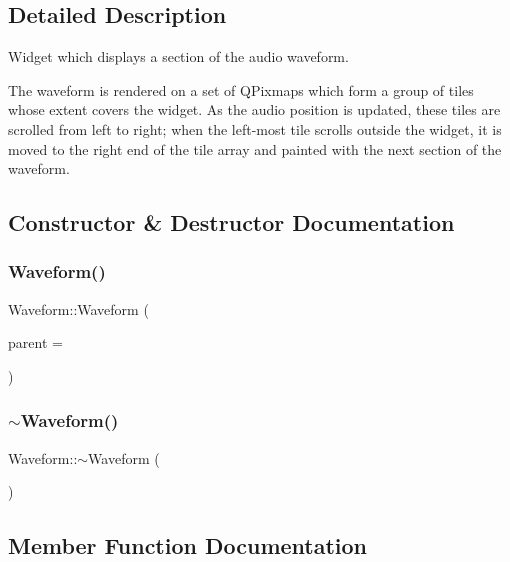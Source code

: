 \subsection{Detailed Description}
Widget which displays a section of the audio waveform.

The waveform is rendered on a set of Q\+Pixmaps which form a group of tiles whose extent covers the widget. As the audio position is updated, these tiles are scrolled from left to right; when the left-\/most tile scrolls outside the widget, it is moved to the right end of the tile array and painted with the next section of the waveform. 

\subsection{Constructor \& Destructor Documentation}
\hypertarget{class_waveform_a20e3236d7e3d215fcddd51062fcff350}{}\label{class_waveform_a20e3236d7e3d215fcddd51062fcff350} 
\subsubsection{\texorpdfstring{Waveform()}{Waveform()}}
{\footnotesize\ttfamily Waveform\+::\+Waveform (\begin{DoxyParamCaption}\item[{Q\+Widget $\ast$}]{parent = {} }\end{DoxyParamCaption})\hspace{0.3cm}{\ttfamily [explicit]}}

\hypertarget{class_waveform_af4f2ae8b1749306657602b53a8ab90df}{}\label{class_waveform_af4f2ae8b1749306657602b53a8ab90df} 
\subsubsection{\texorpdfstring{$\sim$\+Waveform()}{~Waveform()}}
{\footnotesize\ttfamily Waveform\+::$\sim$\+Waveform (\begin{DoxyParamCaption}{ }\end{DoxyParamCaption})}



\subsection{Member Function Documentation}
\hypertarget{class_waveform_a3f6b6306fc0da548a763bf41d523fe28}{}\label{class_waveform_a3f6b6306fc0da548a763bf41d523fe28} 
